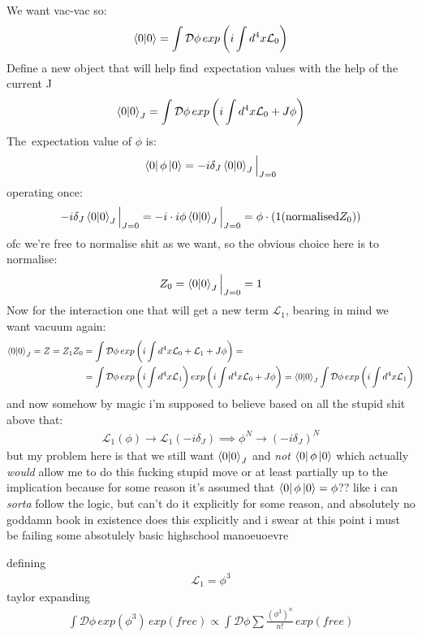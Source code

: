 \documentclass{article}
\begin{document}
We want vac-vac so: 
\begin{align}
    \braket{0}{0}=\int \mathcal{D} \phi \,exp \left( i \int d^4x \mathcal{L}_0 \right)
\end{align}
Define a new object that will help find \,expectation values with the help of the current J
\begin{align}
    \braket{0}{0}_J = \int \mathcal{D} \phi \,exp \left( i \int d^4x \mathcal{L}_0 + J\phi \right)
\end{align}
The \,expectation value of $\phi$ is:
\begin{align}
    \bra{0}\phi\ket{0} = -i \delta_J \braket{0}{0}_J \Big\rvert_{J=0}
\end{align}
operating once:
\begin{align}
-i \delta_J \braket{0}{0}_J \Big\rvert_{J=0} = -i \cdot i \phi \braket{0}{0}_J \Big\rvert_{J=0} = \phi \cdot (1 (\text{normalised} Z_0))
\end{align}
ofc we're free to normalise shit as we want, so the obvious choice here is to normalise:
\begin{align}
    Z_0 = \braket{0}{0}_J \Big\rvert_{J=0} = 1
\end{align}
Now for the interaction one that will get a new term $\mathcal{L}_1$, bearing in mind we want vacuum again:
\begin{align}
    \braket{0}{0}_J = Z = Z_1 Z_0 &= \int \mathcal{D}\phi \,exp \left( i \int d^4x \mathcal{L}_0 + \mathcal{L}_1 + J\phi \right) = \\
                                  &= \int \mathcal{D}\phi \,exp \left( i \int d^4x \mathcal{L}_1  \right) exp \left( i\int d^4x \mathcal{L}_0  + J\phi \right) = \braket{0}{0}_J\int \mathcal{D}\phi \,exp \left( i \int d^4x \mathcal{L}_1  \right) 
\end{align}
and now somehow by magic i'm supposed to believe based on all the stupid shit above that:
\begin{align}
    \mathcal{L}_1 (\phi) \to \mathcal{L}_1 (-i \delta_J) \implies \phi^N \to (-i \delta_J)^N
\end{align}
but my problem here is that we still want $\braket{0}{0}_J$ and \textit{not} $\bra{0}\phi\ket{0}$ which actually \textit{would} allow me to do this fucking stupid move or at least partially up to the implication because for some reason it's assumed that $\bra{0}\phi\ket{0} = \phi$?? like i can \textit{sorta} follow the logic, but can't do it explicitly for some reason, and absolutely no goddamn book in existence does this explicitly and i swear at this point i must be failing some absotulely basic highschool manoeuoevre\par
defining
\begin{align}
    \mathcal{L}_1 = \phi^3
\end{align}
taylor expanding
\begin{align}
    \int \mathcal{D} \phi \, exp \left( \phi^3 \right) \, exp(free) \propto  \int \mathcal{D}\phi\sum \frac{(\phi^3)^n}{n!} \, exp(free) 
\end{align}
\end{document}
